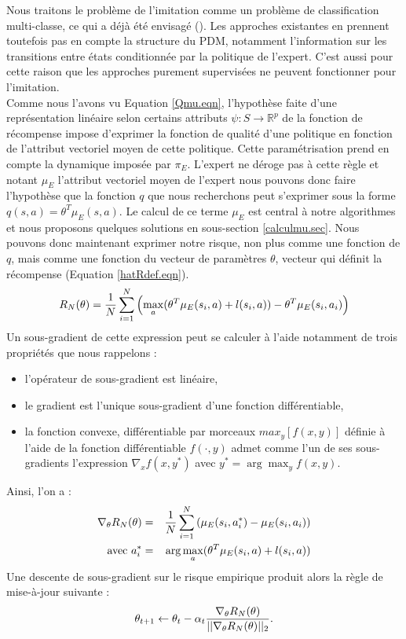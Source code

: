 \documentclass[publibook-draft]{CAp2012}
\begin{document}
Nous traitons le problème de l'imitation comme un problème de classification multi-classe, ce qui a déjà été envisagé (\citep{ratliff2007imitation}). Les approches existantes en prennent toutefois pas en compte la structure du PDM, notamment l'information sur les transitions entre états conditionnée par la politique de l'expert. C'est aussi pour cette raison que les approches purement supervisées ne peuvent fonctionner pour l'imitation.\\

Comme nous l'avons vu Equation \eqref{Qmu.eqn}, l'hypothèse faite d'une représentation linéaire selon certains attributs $\psi : S\rightarrow \mathbb{R}^p$ de la fonction de récompense impose d'exprimer la fonction de qualité d'une politique en fonction de l'attribut vectoriel moyen de cette politique. Cette paramétrisation prend en compte la dynamique imposée par $\pi_E$. L'expert ne déroge pas à cette règle et notant $\mu_E$ l'attribut vectoriel moyen de l'expert nous pouvons donc faire l'hypothèse que la fonction $q$ que nous recherchons peut s'exprimer sous la forme $q(s,a) = \theta^T\mu_E(s,a)$. Le calcul de ce terme $\mu_E$ est central à notre algorithmes et nous proposons quelques solutions en sous-section \ref{calculmu.sec}. Nous pouvons donc maintenant exprimer notre risque, non plus comme une fonction de $q$, mais comme une fonction du vecteur de paramètres $\theta$, vecteur qui définit la récompense (Equation \eqref{hatRdef.eqn}).
   \begin{equation}
     \label{structure.eqn}
   R_N(\theta)  = {1\over N} \sum_{i=1}^N\left(\max_a(\theta ^T \mu_E(s_i,a) + l(s_i,a)) - \theta ^T \mu_E(s_i,a_i) \right)
   \end{equation}
   Un sous-gradient de cette expression peut se calculer à l'aide notamment de trois propriétés que nous rappelons :
\begin{itemize}
  \item l'opérateur de sous-gradient est linéaire,
  \item le gradient est l'unique sous-gradient d'une fonction différentiable,
  \item la fonction convexe, différentiable par morceaux $max_y[f(x,y)]$ définie à l'aide de la fonction différentiable $f(\cdot,y)$ admet comme l'un de ses sous-gradients l'expression $\nabla_xf(x,y^*)$ avec $y^*=\arg\max_yf(x,y)$.
\end{itemize}
Ainsi, l'on a :
\begin{eqnarray}
\nabla_\theta R_N(\theta) &=& {1\over N}\sum\limits_{i=1}^N\left(\mu_E(s_i,a^*_i) - \mu_E(s_i,a_i)\right)\\
\textrm{avec } a^*_i &=& \arg\max_a(\theta ^T \mu_E(s_i,a) + l(s_i,a))
\end{eqnarray}
Une descente de sous-gradient sur le risque empirique produit alors la règle de mise-à-jour suivante :
\begin{equation}
   \theta_{t+1} \leftarrow \theta_t -\alpha_t{\nabla_\theta R_N(\theta) \over ||\nabla_\theta R_N(\theta)||_2}.
\end{equation}
\end{document}

